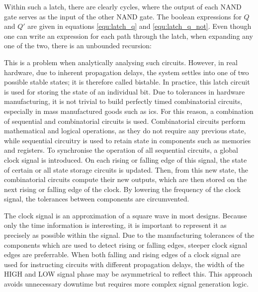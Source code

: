 Within such a latch, there are clearly cycles, where the output of each NAND gate serves as the input of the other NAND gate. The boolean expressions for $Q$ and $Q'$ are given in equations \ref{equ:latch_q} and \ref{equ:latch_q_not}. Even though one can write an expression for each path through the latch, when expanding any one of the two, there is an unbounded recursion:

This is a problem when analytically analysing such circuits. However, in real hardware, due to inherent propagation delays, the system settles into one of two possible stable states; it is therefore called bistable. In practice, this latch circuit is used for storing the state of an individual bit. Due to tolerances in hardware manufacturing, it is not trivial to build perfectly timed combinatorial circuits, especially in mass manufactured goods such as \acp{ic}. For this reason, a combination of sequential and combinatorial circuits is used. Combinatorial circuits perform mathematical and logical operations, as they do not require any previous state, while sequential circuitry is used to retain state in components such as memories and registers. To synchronise the operation of all sequential circuits, a global clock signal is introduced. On each rising or falling edge of this signal, the state of certain or all state storage circuits is updated. Then, from this new state, the combinatorial circuits compute their new outputs, which are then stored on the next rising or falling edge of the clock. By lowering the frequency of the clock signal, the tolerances between components are circumvented.

The clock signal is an approximation of a square wave in most designs. Because only the time information is interesting, it is important to represent it as precisely as possible within the signal. Due to the manufacturing tolerances of the components which are used to detect rising or falling edges, steeper clock signal edges are preferrable. When both falling and rising edges of a clock signal are used for instructing circuits with different propagation delays, the width of the HIGH and LOW signal phase may be asymmetrical to reflect this. This approach avoids unnecessary downtime but requires more complex signal generation logic.